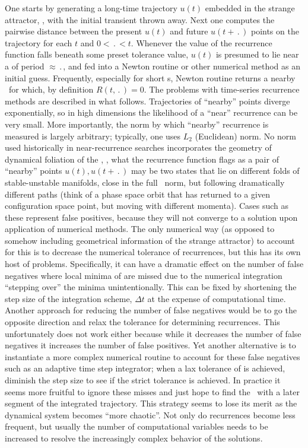One starts by generating a long-time trajectory $u(t)$ embedded in the
strange attractor, \ie, with the initial transient thrown away. Next one
computes the pairwise distance
between the present $u(t)$ and future $u(t+\period{})$ points
on the trajectory for each $t$ and $0<\period{}<t$. Whenever the value of the
recurrence function falls beneath some preset tolerance value, $u(t)$ is
presumed to lie near a {\po} of period $\approx \period{}$, and fed into a
Newton routine or other numerical method
as an initial guess. Frequently, especially for short \po s,
Newton routine returns a nearby \po\ for which, by definition
$R(t,\period{})=0$.
The problems with time-series recurrence methods are described
in what follows.
Trajectories of ``nearby'' points diverge exponentially, so
in high dimensions the likelihood of a ``near'' recurrence can be very
small.
More importantly, the norm by which ``nearby'' recurrence
 is measured is largely arbitrary; typically, one uses
$L_2$ (Euclidean) norm. No norm used historically in near-recurrence
searches incorporates the geometry of dynamical foliation of the
\statesp, \ie, what the recurrence function flags as a pair of ``nearby''
points $u(t),u(t+\period{})$ may be two states that lie on different folds of
stable-unstable manifolds, close in the full \statesp\ norm, but following
dramatically different paths (think of a phase space orbit that has
returned to a given configuration space point, but moving with
different momenta).
Cases such as these represent false
positives, because they will not converge to a solution
upon application of numerical methods. The only
numerical way (as opposed to somehow including geometrical information
of the strange attractor)
to account for this is to
decrease the numerical tolerance of
recurrences, but this has its own host of problems.
Specifically, it can have a dramatic effect on the
number of false negatives where local
minima of  are missed due to the
numerical integration ``stepping over''
the minima unintentionally.
This can be fixed by shortening the step
size of the integration scheme, $\Delta t$
at the expense of computational time.
Another approach for reducing the number
of false negatives would be to go the opposite
direction and relax the tolerance
for determining recurrences.
This unfortunately does not
work either because while it decreases the number of false
negatives it increases the number of false
positives.
Yet another alternative is to instantiate a more complex
numerical routine to account for these false negatives
such as an adaptive time step integrator; when a
lax tolerance of  is achieved,
diminish the step size to see if the strict
tolerance is achieved. In practice
it seems more fruitful to ignore these misses and
just hope to find the \po\ with a later segment of
the integrated trajectory. This strategy seems to
lose its merit as the dynamical system becomes ``more chaotic''.
Not only do recurrences become less frequent, but usually
the number of computational variables needs to be
increased to resolve the increasingly complex behavior
of the solutions.

